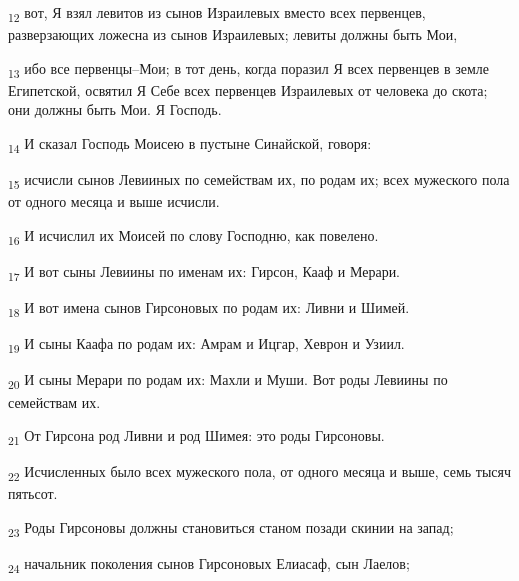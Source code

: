 \begin{tcolorbox}
\textsubscript{12} вот, Я взял левитов из сынов Израилевых вместо всех первенцев, разверзающих ложесна из сынов Израилевых; левиты должны быть Мои,
\end{tcolorbox}
\begin{tcolorbox}
\textsubscript{13} ибо все первенцы--Мои; в тот день, когда поразил Я всех первенцев в земле Египетской, освятил Я Себе всех первенцев Израилевых от человека до скота; они должны быть Мои. Я Господь.
\end{tcolorbox}
\begin{tcolorbox}
\textsubscript{14} И сказал Господь Моисею в пустыне Синайской, говоря:
\end{tcolorbox}
\begin{tcolorbox}
\textsubscript{15} исчисли сынов Левииных по семействам их, по родам их; всех мужеского пола от одного месяца и выше исчисли.
\end{tcolorbox}
\begin{tcolorbox}
\textsubscript{16} И исчислил их Моисей по слову Господню, как повелено.
\end{tcolorbox}
\begin{tcolorbox}
\textsubscript{17} И вот сыны Левиины по именам их: Гирсон, Кааф и Мерари.
\end{tcolorbox}
\begin{tcolorbox}
\textsubscript{18} И вот имена сынов Гирсоновых по родам их: Ливни и Шимей.
\end{tcolorbox}
\begin{tcolorbox}
\textsubscript{19} И сыны Каафа по родам их: Амрам и Ицгар, Хеврон и Узиил.
\end{tcolorbox}
\begin{tcolorbox}
\textsubscript{20} И сыны Мерари по родам их: Махли и Муши. Вот роды Левиины по семействам их.
\end{tcolorbox}
\begin{tcolorbox}
\textsubscript{21} От Гирсона род Ливни и род Шимея: это роды Гирсоновы.
\end{tcolorbox}
\begin{tcolorbox}
\textsubscript{22} Исчисленных было всех мужеского пола, от одного месяца и выше, семь тысяч пятьсот.
\end{tcolorbox}
\begin{tcolorbox}
\textsubscript{23} Роды Гирсоновы должны становиться станом позади скинии на запад;
\end{tcolorbox}
\begin{tcolorbox}
\textsubscript{24} начальник поколения сынов Гирсоновых Елиасаф, сын Лаелов;
\end{tcolorbox}
